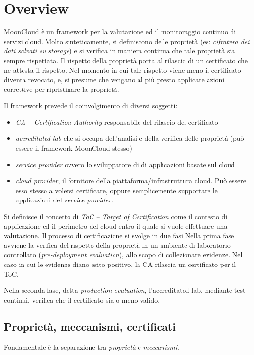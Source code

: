 \section{Overview}\label{sec:mooncloud-overview}
MoonCloud è un framework per la valutazione ed il monitoraggio continuo
di servizi cloud.
Molto sinteticamente, si definiscono delle proprietà (es: \textit{cifratura
dei dati salvati su storage}) e si verifica in maniera continua che tale
proprietà sia sempre rispettata. Il rispetto della proprietà porta al
rilascio di un certificato che ne attesta il rispetto. Nel momento in cui
tale rispetto viene meno il certificato diventa revocato, e, si presume
che vengano al più presto applicate azioni correttive per ripristinare
la proprietà.


Il framework prevede il coinvolgimento di diversi soggetti:
\begin{itemize}
    \item \textit{CA -- Certification Authority} responsabile del
    rilascio dei certificato
    \item \textit{accreditated lab} che si occupa dell'analisi e della
    verifica delle proprietà (può essere il framework MoonCloud stesso)
    \item \textit{service provider} ovvero lo sviluppatore di di applicazioni
    basate sul cloud
    \item \textit{cloud provider}, il fornitore della piattaforma/infrastruttura
    cloud. Può essere esso stesso a volersi certificare, oppure semplicemente
    supportare le applicazioni del \textit{service provider}.
\end{itemize}

Si definisce il concetto di \textit{ToC -- Target of Certification} come il
contesto di applicazione ed il perimetro del cloud entro il quale
si vuole effettuare una valutazione.
Il processo di certificazione si svolge in due fasi Nella prima fase
avviene la verifica del rispetto della proprietà in un ambiente di
laboratorio controllato (\textit{pre-deployment evaluation}), allo scopo
di collezionare evidenze.
Nel caso in cui le evidenze diano esito positivo, la CA rilascia
un certificato per il ToC.

Nella seconda fase, detta \textit{production evaluation}, l'accreditated
lab, mediante test continui, verifica che il certificato sia o meno
valido.

\subsection{Proprietà, meccanismi, certificati}
Fondamentale è la separazione tra \textit{proprietà} e \textit{meccanismi}.

